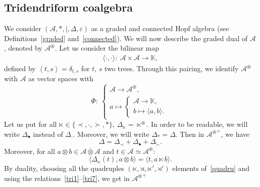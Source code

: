 \documentclass[10pt,a4paper]{amsart}
\numberwithin{equation}{section}
\theoremstyle{definition}
\theoremstyle{plain}
\newcommand{\K}{\mathbb{K}}
\begin{document}
\subsection{Tridendriform coalgebra}
We consider $(\mathcal{A},*,|,\Delta,\varepsilon)$ as a graded and connected Hopf algebra (see Definitions~\ref{graded} and~\ref{connected}).
We will now describe the graded dual of $\mathcal{A}$, denoted by $\mathcal{A}^{\circledast}$. Let us consider the bilinear map
\begin{gather*}
	\langle \cdot,\cdot \rangle \colon \
		\mathcal{A}\times \mathcal{A} \rightarrow \K,
\end{gather*}
 defined by $\left\langle t,s \right\rangle=\delta_{t,s}$ for $t$, $s$ two trees. Through this pairing, we identify $\mathcal{A}^{\circledast}$ with $\mathcal{A}$ as vector spaces with
\begin{equation}\label{eq:pairing}
	\Phi\colon \ \begin{cases}
		\mathcal{A} \rightarrow \mathcal{A}^{\circledast}, \\
		a \mapsto \begin{cases}
			\mathcal{A} \rightarrow \K, \\
			b \mapsto \langle a,b \rangle.
		\end{cases}
	\end{cases}
\end{equation}
Let us put for all $\ltimes\in\{\prec,\cdot,\succ,*\}$, $\Delta_{\ltimes}={\ltimes}^{\circledast}.$
In order to be readable, we will write $\Delta_{\bullet}$ instead of $\Delta_{\cdot}$. Moreover, we will write $\Delta_*=\Delta$. Then in ${\mathcal{A}^{\circledast}}^+$, we have
\[
\Delta=\Delta_{\prec}+\Delta_{\bullet}+\Delta_{\succ}.
\]
Moreover, for all $a\otimes b\in \mathcal{A}\overline{\otimes} \mathcal{A}$ and $t\in \mathcal{A}\simeq \mathcal{A}^{\circledast}$:
\[
 \langle \Delta_{\ltimes}(t),a\otimes b \rangle= \langle t,a\ltimes b \rangle.
\]
By duality, choosing all the quadruples $(\ltimes,\rtimes,\ltimes',\rtimes')$ elements of~\eqref{quadru} and using the relations~\eqref{tri1}--\eqref{tri7}, we get in ${\mathcal{A}^{\circledast}}^+$
\end{document}
